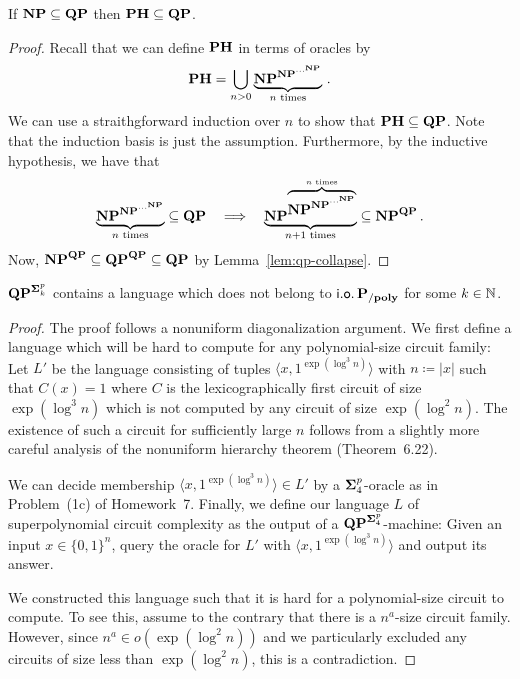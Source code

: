 \documentclass[11pt]{article}
\begin{document}
\begin{lemma}
	\label{lem:ph-sub-qp}
	If $\mathbf{NP} \subseteq \mathbf{QP}$ then
	$\mathbf{PH} \subseteq \mathbf{QP}$.
\end{lemma}

\begin{proof}
  Recall that we can define $\mathbf{PH}$ in terms of oracles by
  \[
    \mathbf{PH} =
    \bigcup_{n > 0} \underbrace{\mathbf{NP}^{\mathbf{NP}^{\cdots^{\mathbf{NP}}}}}_{n \textrm{ times}}
    \,.
  \]
  We can use a straithgforward induction over $n$ to show that
  $\mathbf{PH} \subseteq \mathbf{QP}$.
  Note that the induction basis is just the assumption.
  Furthermore, by the inductive hypothesis, we have that
  \[
    \underbrace{\mathbf{NP}^{\mathbf{NP}^{\cdots^{\mathbf{NP}}}}}_{n \textrm{ times}}
    \subseteq
    \mathbf{QP}
    \quad
    \Longrightarrow
    \quad
    \underbrace{\mathbf{NP}^{\overbrace{
      \mathbf{NP}^{\mathbf{NP}^{\cdots^{\mathbf{NP}}}}
    }^{n \textrm{ times}}}}_{n+1 \textrm{ times}}
    \subseteq
    \mathbf{NP}^{\mathbf{QP}} \,.
  \]
  Now, $\mathbf{NP}^{\mathbf{QP}} \subseteq \mathbf{QP}^{\mathbf{QP}} \subseteq \mathbf{QP} $
  by Lemma~\ref{lem:qp-collapse}.
\end{proof}

\begin{lemma}
	\label{lem:qp-super-circ}
	$\mathbf{QP}^{\mathbf{\Sigma}^p_k}$ contains a language which does not belong
	to $\mathsf{i.o.}\, \mathbf{P_{/poly}}$ for some $k \in {\mathbb{N}}$.
\end{lemma}

\begin{proof}
	The proof follows a nonuniform diagonalization argument. We first define
	a language which will be hard to compute for any polynomial-size circuit
	family:
	Let $L'$ be the language consisting of tuples
	$\langle x, 1^{\exp(\log^3 n)} \rangle$
	with $n \coloneqq |x|$
	such that $C(x) = 1$ where $C$ is the
	lexicographically first circuit of size $\exp(\log^3 n)$ which is not
	computed by any circuit of size $\exp(\log^2 n)$.
	The existence of such a circuit for sufficiently large $n$ follows from a
	slightly more careful analysis of the nonuniform hierarchy theorem
	(Theorem~6.22).
	
	We can decide membership $\langle x, 1^{\exp(\log^3 n)} \rangle \in L'$
	by a $\mathbf{\Sigma}^p_4$-oracle as in Problem~(1c) of Homework~7.
	Finally, we define our language $L$ of superpolynomial circuit complexity
	as the output of a $\mathbf{QP}^{\mathbf{\Sigma}^p_4}$-machine: Given an input
	$x \in \{0,1\}^n$, query the oracle for $L'$ with
	$\langle x, 1^{\exp(\log^3 n)} \rangle$ and output its answer.
	
	We constructed this language such that it is hard for a polynomial-size
	circuit to compute. To see this, assume to the contrary that there is
	a $n^a$-size circuit family.
	However, since $n^a \in o(\exp(\log^2 n))$ and we particularly excluded any
	circuits of size less than $\exp(\log^2 n)$, this is a contradiction.
\end{proof}
\end{document}
